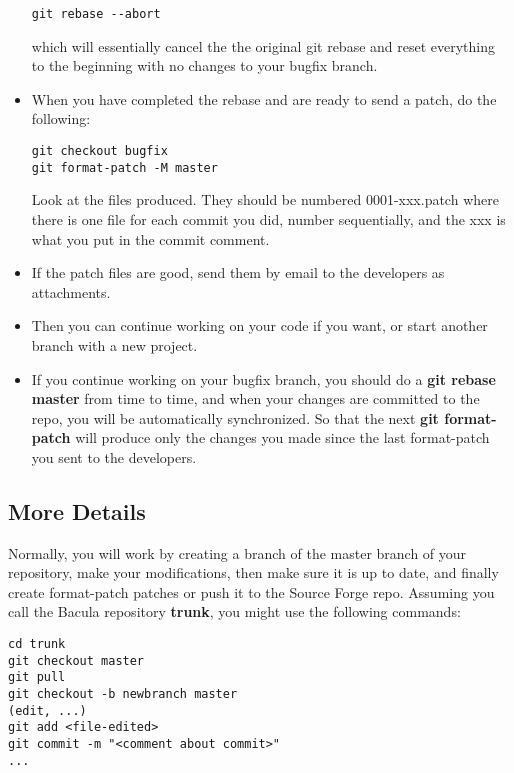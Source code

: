 \begin{itemize}
\begin{verbatim}
git rebase --abort
\end{verbatim}

      which will essentially cancel the the original git rebase and reset
      everything to the beginning with no changes to your bugfix branch.

\item When you have completed the rebase and 
      are ready to send a patch, do the following:\\
\begin{verbatim}
git checkout bugfix
git format-patch -M master
\end{verbatim}
       Look at the files produced.  They should be numbered 0001-xxx.patch
       where there is one file for each commit you did, number sequentially,
       and the xxx is what you put in the commit comment.

\item If the patch files are good, send them by email to the developers
      as attachments.

\item Then you can continue working on your code if you want, or
      start another branch with a new project.

\item If you continue working on your bugfix branch, you should
      do a {\bf git rebase master} from time to time, and when
      your changes are committed to the repo, you will be automatically
      synchronized.  So that the next {\bf git format-patch} will produce
      only the changes you made since the last format-patch you sent
      to the developers.


\end{itemize}



\subsection{More Details}

Normally, you will work by creating a branch of the master branch of your
repository, make your modifications, then make sure it is up to date, and finally
create format-patch patches or push it to the Source Forge repo. Assuming
you call the Bacula repository {\bf trunk}, you might use the following
commands:

\begin{verbatim}
cd trunk
git checkout master
git pull 
git checkout -b newbranch master
(edit, ...)
git add <file-edited>
git commit -m "<comment about commit>"
...
\end{verbatim}

